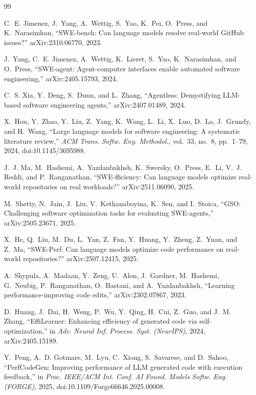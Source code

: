 \documentclass[conference]{IEEEtran}
\begin{document}

\begin{thebibliography}{99}

C.~E. Jimenez, J.~Yang, A.~Wettig, S.~Yao, K.~Pei, O.~Press, and K.~Narasimhan,
``{SWE}-bench: Can language models resolve real-world {GitHub} issues?''
arXiv:2310.06770, 2023.

J.~Yang, C.~E. Jimenez, A.~Wettig, K.~Lieret, S.~Yao, K.~Narasimhan, and O.~Press,
``{SWE}-agent: Agent-computer interfaces enable automated software engineering,''
arXiv:2405.15793, 2024.

C.~S. Xia, Y.~Deng, S.~Dunn, and L.~Zhang,
``Agentless: Demystifying {LLM}-based software engineering agents,''
arXiv:2407.01489, 2024.

X.~Hou, Y.~Zhao, Y.~Liu, Z.~Yang, K.~Wang, L.~Li, X.~Luo, D.~Lo, J.~Grundy, and H.~Wang,
``Large language models for software engineering: A systematic literature review,''
\emph{ACM Trans. Softw. Eng. Methodol.}, vol.~33, no.~8, pp.~1--79, 2024,
doi:10.1145/3695988.

J.~J. Ma, M.~Hashemi, A.~Yazdanbakhsh, K.~Swersky, O.~Press, E.~Li, V.~J. Reddi, and P.~Ranganathan,
``{SWE-fficiency}: Can language models optimize real-world repositories on real workloads?''
arXiv:2511.06090, 2025.

M.~Shetty, N.~Jain, J.~Liu, V.~Kethanaboyina, K.~Sen, and I.~Stoica,
``{GSO}: Challenging software optimization tasks for evaluating {SWE}-agents,''
arXiv:2505.23671, 2025.

X.~He, Q.~Liu, M.~Du, L.~Yan, Z.~Fan, Y.~Huang, Y.~Zheng, Z.~Yuan, and Z.~Ma,
``{SWE-Perf}: Can language models optimize code performance on real-world repositories?''
arXiv:2507.12415, 2025.

A.~Shypula, A.~Madaan, Y.~Zeng, U.~Alon, J.~Gardner, M.~Hashemi, G.~Neubig, P.~Ranganathan, O.~Bastani, and A.~Yazdanbakhsh,
``Learning performance-improving code edits,''
arXiv:2302.07867, 2023.

D.~Huang, J.~Dai, H.~Weng, P.~Wu, Y.~Qing, H.~Cui, Z.~Guo, and J.~M. Zhang,
``{EffiLearner}: Enhancing efficiency of generated code via self-optimization,''
in \emph{Adv. Neural Inf. Process. Syst. (NeurIPS)}, 2024, arXiv:2405.15189.

Y.~Peng, A.~D. Gotmare, M.~Lyu, C.~Xiong, S.~Savarese, and D.~Sahoo,
``{PerfCodeGen}: Improving performance of {LLM} generated code with execution feedback,''
in \emph{Proc. IEEE/ACM Int. Conf. AI Found. Models Softw. Eng. (FORGE)}, 2025,
doi:10.1109/Forge66646.2025.00008.


\end{thebibliography}
\end{document}
